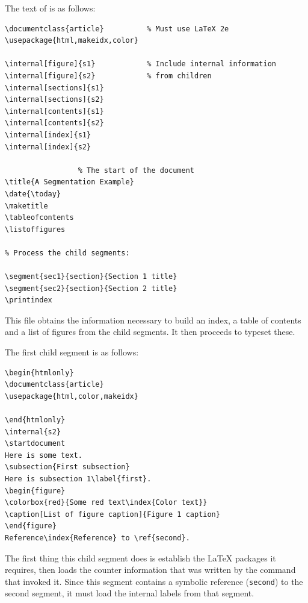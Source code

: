 \medskip\htmlrule[width=300]
\html{\\}\noindent
The text of  is as follows:
\begin{small}
\begin{verbatim}
\documentclass{article}          % Must use LaTeX 2e
\usepackage{html,makeidx,color}

\internal[figure]{s1}            % Include internal information
\internal[figure]{s2}            % from children
\internal[sections]{s1}
\internal[sections]{s2}
\internal[contents]{s1}
\internal[contents]{s2}
\internal[index]{s1}
\internal[index]{s2}

                 % The start of the document
\title{A Segmentation Example}
\date{\today}
\maketitle
\tableofcontents
\listoffigures

% Process the child segments:

\segment{sec1}{section}{Section 1 title}
\segment{sec2}{section}{Section 2 title}
\printindex

\end{verbatim}
\end{small}
This file obtains the information necessary to build an
index, a table of contents and a list of figures from the
child segments.  It then proceeds to typeset these.

\medskip\htmlrule[width=300]
\html{\\}\noindent
The first child segment  is as follows:
\begin{small}
\begin{verbatim}
\begin{htmlonly}
\documentclass{article}
\usepackage{html,color,makeidx}

\end{htmlonly}
\internal{s2}
\startdocument
Here is some text.
\subsection{First subsection}
Here is subsection 1\label{first}.
\begin{figure}
\colorbox{red}{Some red text\index{Color text}}
\caption[List of figure caption]{Figure 1 caption}
\end{figure}
Reference\index{Reference} to \ref{second}.
\end{verbatim}
\end{small}
The first thing this child segment does is establish the \LaTeX{} 
packages it requires, then loads the counter information that
was written by the  command that invoked it.
Since this segment contains a symbolic reference (\texttt{second})
to the second segment, it must load the internal labels from
that segment.

